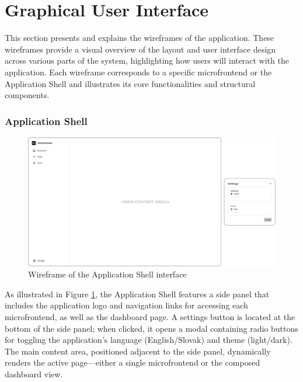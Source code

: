 \section{Graphical User Interface}
This section presents and explains the wireframes of the application. These wireframes provide a visual overview of the layout and user interface design across various parts of the system, highlighting how users will interact with the application. Each wireframe corresponds to a specific microfrontend or the Application Shell and illustrates its core functionalities and structural components.

\subsubsection*{Application Shell}
\begin{figure}[h]
    \centerline{\includegraphics[width=1\textwidth]{images/wireframes/application-shell.png}}
    \caption[Application Shell wireframe]{Wireframe of the Application Shell interface}
    \label{fig:shell-wireframe} 
\end{figure}
As illustrated in Figure \ref{fig:shell-wireframe}, the Application Shell features a side panel that includes the application logo and navigation links for accessing each microfrontend, as well as the dashboard page. A settings button is located at the bottom of the side panel; when clicked, it opens a modal containing radio buttons for toggling the application's language (English/Slovak) and theme (light/dark). The main content area, positioned adjacent to the side panel, dynamically renders the active page—either a single microfrontend or the composed dashboard view.

